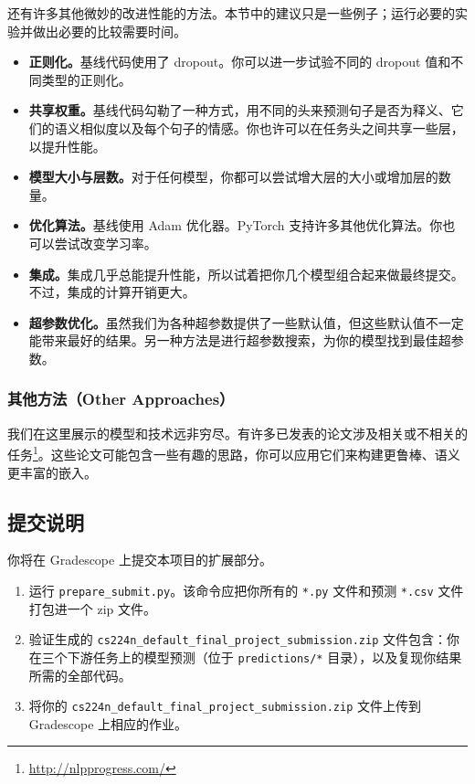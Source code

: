 \documentclass[11pt]{article}
\begin{document}
还有许多其他微妙的改进性能的方法。本节中的建议只是一些例子；运行必要的实验并做出必要的比较需要时间。

\begin{itemize}[leftmargin=1.5em]
  \item \textbf{正则化。}基线代码使用了 dropout。你可以进一步试验不同的 dropout 值和不同类型的正则化。
  \item \textbf{共享权重。}基线代码勾勒了一种方式，用不同的头来预测句子是否为释义、它们的语义相似度以及每个句子的情感。你也许可以在任务头之间共享一些层，以提升性能。
  \item \textbf{模型大小与层数。}对于任何模型，你都可以尝试增大层的大小或增加层的数量。
  \item \textbf{优化算法。}基线使用 Adam 优化器。PyTorch 支持许多其他优化算法。你也可以尝试改变学习率。
  \item \textbf{集成。}集成几乎总能提升性能，所以试着把你几个模型组合起来做最终提交。不过，集成的计算开销更大。
  \item \textbf{超参数优化。}虽然我们为各种超参数提供了一些默认值，但这些默认值不一定能带来最好的结果。另一种方法是进行超参数搜索，为你的模型找到最佳超参数。
\end{itemize}

\subsubsection{其他方法（Other Approaches）}

我们在这里展示的模型和技术远非穷尽。有许多已发表的论文涉及相关或不相关的任务\footnote{\url{http://nlpprogress.com/}}。这些论文可能包含一些有趣的思路，你可以应用它们来构建更鲁棒、语义更丰富的嵌入。

\subsection{提交说明}

你将在 Gradescope 上提交本项目的扩展部分。

\begin{enumerate}
  \item 运行 \texttt{prepare\_submit.py}。该命令应把你所有的 \texttt{*.py} 文件和预测 \texttt{*.csv} 文件打包进一个 zip 文件。
  \item 验证生成的 \texttt{cs224n\_default\_final\_project\_submission.zip} 文件包含：你在三个下游任务上的模型预测（位于 \texttt{predictions/*} 目录），以及复现你结果所需的全部代码。
  \item 将你的 \texttt{cs224n\_default\_final\_project\_submission.zip} 文件上传到 Gradescope 上相应的作业。
\end{enumerate}
\end{document}
